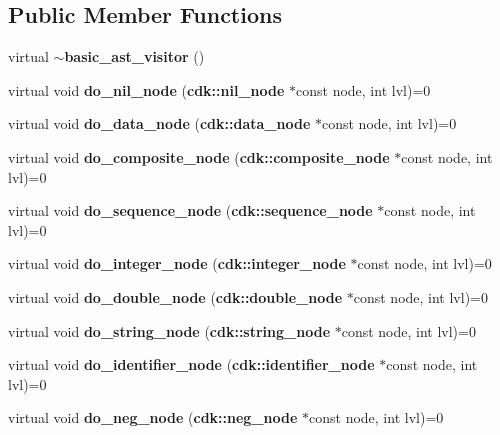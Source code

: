 \subsection*{Public Member Functions}
\begin{DoxyCompactItemize}
\item 
virtual {\bf $\sim$basic\+\_\+ast\+\_\+visitor} ()
\item 
virtual void {\bfseries do\+\_\+nil\+\_\+node} ({\bf cdk\+::nil\+\_\+node} $\ast$const node, int lvl)=0\label{classbasic__ast__visitor_a02f54aebc971eb949ef263b972c1d5c9}

\item 
virtual void {\bfseries do\+\_\+data\+\_\+node} ({\bf cdk\+::data\+\_\+node} $\ast$const node, int lvl)=0\label{classbasic__ast__visitor_a92a91d350c0447876448dc89adb872d6}

\item 
virtual void {\bfseries do\+\_\+composite\+\_\+node} ({\bf cdk\+::composite\+\_\+node} $\ast$const node, int lvl)=0\label{classbasic__ast__visitor_a0b5b9548265a03019141b63c7f5934b4}

\item 
virtual void {\bfseries do\+\_\+sequence\+\_\+node} ({\bf cdk\+::sequence\+\_\+node} $\ast$const node, int lvl)=0\label{classbasic__ast__visitor_adfbe26d736fab220458165a60888e563}

\item 
virtual void {\bfseries do\+\_\+integer\+\_\+node} ({\bf cdk\+::integer\+\_\+node} $\ast$const node, int lvl)=0\label{classbasic__ast__visitor_a16cb8f6c1790a95f3e65019272645d0d}

\item 
virtual void {\bfseries do\+\_\+double\+\_\+node} ({\bf cdk\+::double\+\_\+node} $\ast$const node, int lvl)=0\label{classbasic__ast__visitor_ad44ac45e5172600955897fc6669bf14e}

\item 
virtual void {\bfseries do\+\_\+string\+\_\+node} ({\bf cdk\+::string\+\_\+node} $\ast$const node, int lvl)=0\label{classbasic__ast__visitor_a3f030ce97bbd3f136d7208dd8820d848}

\item 
virtual void {\bfseries do\+\_\+identifier\+\_\+node} ({\bf cdk\+::identifier\+\_\+node} $\ast$const node, int lvl)=0\label{classbasic__ast__visitor_a1e8c56656489408c46def651164c0506}

\item 
virtual void {\bfseries do\+\_\+neg\+\_\+node} ({\bf cdk\+::neg\+\_\+node} $\ast$const node, int lvl)=0\label{classbasic__ast__visitor_a0f8aab79e4982b9165c4f2073d0a0791}


\end{DoxyCompactItemize}

